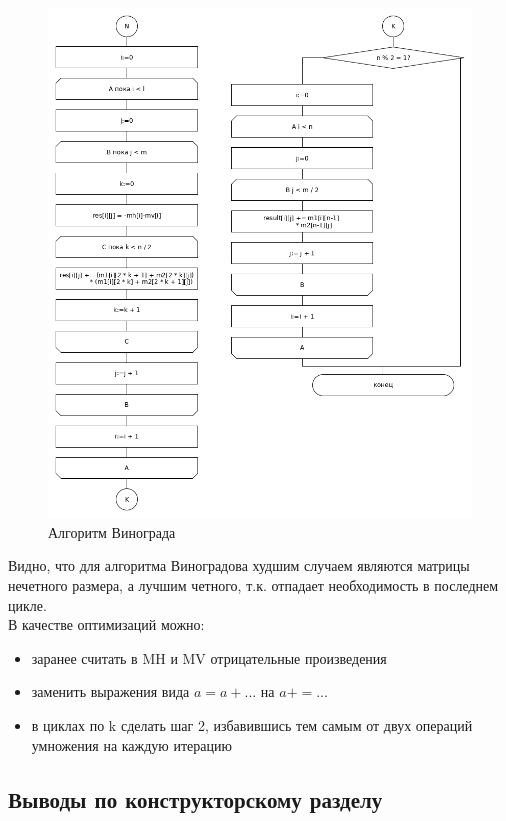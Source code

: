 \documentclass[a4paper,12pt]{article}
\begin{document}
	 		\begin{figure}[H]
	 			\centering
	 			{
	 				\includegraphics[scale=0.51]{vinograd2.png}
	 				\caption{\label{ris:vin2}Алгоритм Винограда}	
	 			}
	 		\end{figure}
	
	Видно, что для алгоритма Виноградова худшим случаем являются матрицы нечетного размера, а лучшим четного, т.к. отпадает необходимость в последнем цикле.\\
	В качестве оптимизаций можно:
	\begin{itemize}
	\item заранее считать в MH и MV отрицательные произведения
	\item заменить выражения вида $a = a + ...$ на $a += ...$
	\item в циклах по k сделать шаг 2, избавившись тем самым от двух операций умножения на каждую итерацию
	\end{itemize}
    \newpage	
    
    \begin{center}
    	\subsection{Выводы по конструкторскому разделу}    
    \end{center}
   
\end{document}
